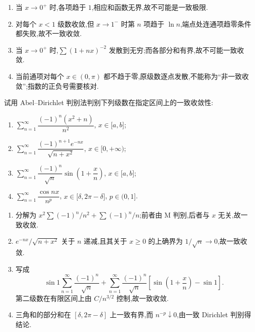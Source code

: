 \begin{solution}
    \leavevmode
    \begin{enumerate}
        \item 当 $x\to0^+$ 时,各项趋于 $1$,相应和函数无界,故不可能是一致极限.
        \item 对每个 $x<1$ 级数收敛,但 $x\to1^-$ 时第 $n$ 项趋于 $\ln n$,端点处连通项趋零条件都失败,故不一致收敛.
        \item 当 $x\to0^+$ 时,$\displaystyle\sum(1+nx)^{-2}$ 发散到无穷;而各部分和有界,故不可能一致收敛.
        \item 当前通项对每个 $x\in(0,\pi)$ 都不趋于零,原级数逐点发散,不能称为``非一致收敛'';指数的正负号需要核对.
    \end{enumerate}
\end{solution}

\begin{example}
    试用 Abel--Dirichlet 判别法判别下列级数在指定区间上的一致收敛性:
    \begin{enumerate}
        \item $\displaystyle\sum\limits_{n=1}^{\infty}\dfrac{(-1)^n(x^2+n)}{n^2}$, $x\in\lbrack a,b\rbrack$;
        \item $\displaystyle\sum\limits_{n=1}^{\infty}\dfrac{(-1)^{n+1}e^{-nx}}{\sqrt{n+x^2}}$, $x\in\lbrack 0,+\infty)$;
        \item $\displaystyle\sum\limits_{n=1}^{\infty}\dfrac{(-1)^n}{\sqrt n}\sin\left(1+\dfrac{x}{n}\right)$, $x\in\lbrack a,b\rbrack$;
        \item $\displaystyle\sum\limits_{n=1}^{\infty}\dfrac{\cos nx}{n^p}$, $x\in\lbrack \delta,2\pi-\delta\rbrack$, $p\in(0,1\rbrack$.
    \end{enumerate}
\end{example}
\exampleblank

\begin{solution}
    \leavevmode
    \begin{enumerate}
        \item 分解为 $x^2\displaystyle\sum(-1)^n/n^2+\sum(-1)^n/n$;前者由 M 判别,后者与 $x$ 无关,故一致收敛.
        \item $e^{-nx}/\sqrt{n+x^2}$ 关于 $n$ 递减,且其关于 $x\geq0$ 的上确界为 $1/\sqrt n\to0$,故一致收敛.
        \item 写成
              \[
                  \sin1\sum\limits_{n=1}^{\infty}\dfrac{(-1)^n}{\sqrt n}
                  +\sum\limits_{n=1}^{\infty}\dfrac{(-1)^n}{\sqrt n}
                  \left[\sin\left(1+\dfrac{x}{n}\right)-\sin1\right].
              \]
              第二级数在有限区间上由 $C/n^{3/2}$ 控制,故一致收敛.
        \item 三角和的部分和在 $[\delta,2\pi-\delta]$ 上一致有界,而 $n^{-p}\downarrow0$,由一致 Dirichlet 判别得结论.
    \end{enumerate}
\end{solution}

